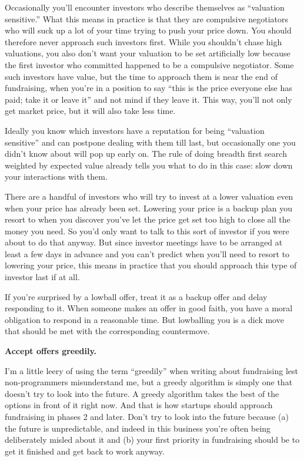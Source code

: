 Occasionally you'll encounter investors who describe themselves as
``valuation sensitive.'' What this means in practice is that they are
compulsive negotiators who will suck up a lot of your time trying to
push your price down. You should therefore never approach such investors
first. While you shouldn't chase high valuations, you also don't want
your valuation to be set artificially low because the first investor who
committed happened to be a compulsive negotiator. Some such investors
have value, but the time to approach them is near the end of
fundraising, when you're in a position to say ``this is the price
everyone else has paid; take it or leave it'' and not mind if they leave
it. This way, you'll not only get market price, but it will also take
less time.

Ideally you know which investors have a reputation for being ``valuation
sensitive'' and can postpone dealing with them till last, but
occasionally one you didn't know about will pop up early on. The rule of
doing breadth first search weighted by expected value already tells you
what to do in this case: slow down your interactions with them.

There are a handful of investors who will try to invest at a lower
valuation even when your price has already been set. Lowering your price
is a backup plan you resort to when you discover you've let the price
get set too high to close all the money you need. So you'd only want to
talk to this sort of investor if you were about to do that anyway. But
since investor meetings have to be arranged at least a few days in
advance and you can't predict when you'll need to resort to lowering
your price, this means in practice that you should approach this type of
investor last if at all.

If you're surprised by a lowball offer, treat it as a backup offer and
delay responding to it. When someone makes an offer in good faith, you
have a moral obligation to respond in a reasonable time. But lowballing
you is a dick move that should be met with the corresponding
countermove.

\textbf{Accept offers greedily.}

I'm a little leery of using the term ``greedily'' when writing about
fundraising lest non-programmers misunderstand me, but a greedy
algorithm is simply one that doesn't try to look into the future. A
greedy algorithm takes the best of the options in front of it right now.
And that is how startups should approach fundraising in phases 2 and
later. Don't try to look into the future because (a) the future is
unpredictable, and indeed in this business you're often being
deliberately misled about it and (b) your first priority in fundraising
should be to get it finished and get back to work anyway.

